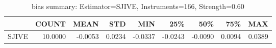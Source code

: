 \begin{table}[ht]
\centering
\caption{bias summary: Estimator=SJIVE, Instruments=166, Strength=0.60}
\begin{tabular}{lrrrrrrrr}
\toprule
 & COUNT & MEAN & STD & MIN & 25\% & 50\% & 75\% & MAX \\
\midrule
SJIVE & 10.0000 & -0.0053 & 0.0234 & -0.0337 & -0.0243 & -0.0090 & 0.0094 & 0.0389 \\
\bottomrule
\end{tabular}
\end{table}
